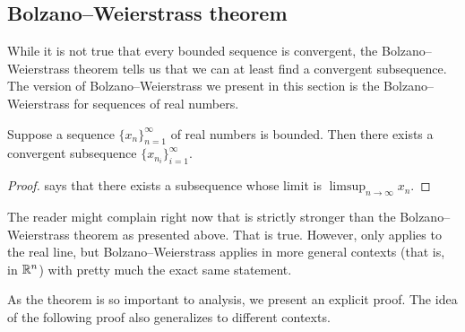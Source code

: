\subsection{Bolzano--Weierstrass theorem}

While it is not true that every bounded sequence is convergent, the
Bolzano--Weierstrass theorem tells us that we can at least find a convergent
subsequence.
The version of Bolzano--Weierstrass 
we present in this section is the Bolzano--Weierstrass for
sequences of real numbers.

\begin{thm}\label{thm:bwseq}
Suppose a sequence $\{ x_n \}_{n=1}^\infty$ of real numbers is bounded.
Then there exists a convergent subsequence $\{ x_{n_i} \}_{i=1}^\infty$.
\end{thm}

\begin{proof}
 says that there exists
a subsequence whose limit is $\limsup_{n\to\infty} x_n$.
\end{proof}

The reader might complain right now that 
 is strictly stronger than the
Bolzano--Weierstrass theorem as presented above.  That is true.
However, 
 only applies to the real line, but
Bolzano--Weierstrass applies in more general contexts (that is, in ${\mathbb{R}}^n$)
with pretty much the exact same statement.

As the theorem is so important to analysis, we present an explicit
proof.
The idea of the following proof also generalizes to different contexts.

